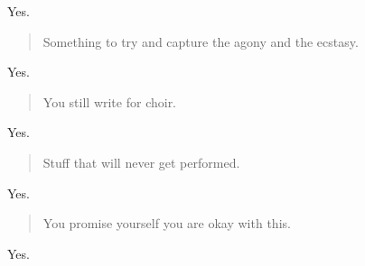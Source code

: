 Yes.

\begin{quote}
Something to try and capture the agony and the ecstasy.
\end{quote}

Yes.

\begin{quote}
You still write for choir.
\end{quote}

Yes.

\begin{quote}
Stuff that will never get performed.
\end{quote}

Yes.

\begin{quote}
You promise yourself you are okay with this.
\end{quote}

Yes.
